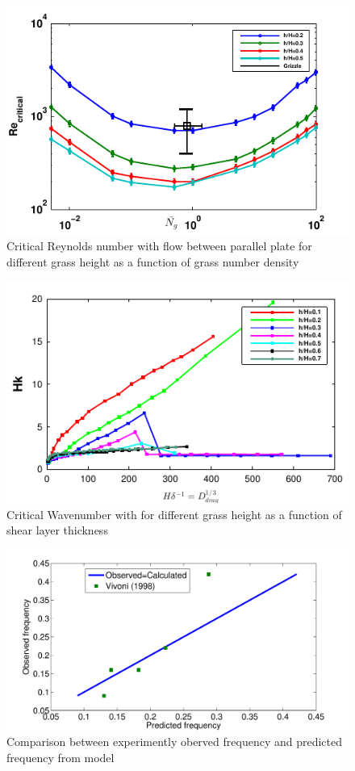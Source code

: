 \documentclass[aps,twocolumn,floatfix,prl,10pt]{revtex4-1}
\begin{document}
\begin{figure}[htb!]
\includegraphics[scale=0.8]{Critical_Re_vs_Ng_Grizzle}
\caption{Critical Reynolds number with flow between parallel plate for different grass height as a function of grass number density}
\end{figure}
\begin{figure}[htb!]
\includegraphics[]{K_vs_shear_width}
\caption{Critical Wavenumber with for different grass height as a function of shear layer thickness}
\end{figure}
\begin{figure}[htb!]
\includegraphics[scale=0.34]{Observed_vs_calculated}
\caption{Comparison between experimently oberved frequency and predicted frequency from model}
\end{figure}
\end{document}
